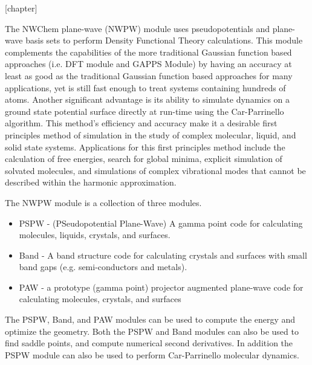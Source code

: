 \label{sec:pspw}

[chapter]
\def\thealgcounter{\thechapter.\arabic{algcounter}}
\newenvironment{algorithm}[1]
               { \refstepcounter{algcounter}
                \begin{center}
                  {\bf Algorithm} \thealgcounter: #1
                \end{center}
               \begin{center}\begin{enumerate} \begin{em}}
               {\end{em}\end{enumerate}\end{center}}
 

The NWChem plane-wave (NWPW) module uses pseudopotentials and
plane-wave basis sets to perform Density Functional Theory
calculations.  This module complements the capabilities of the more
traditional Gaussian function based approaches (i.e. DFT module and
GAPPS Module) by having an accuracy at least as good as the
traditional Gaussian function based approaches for many applications,
yet is still fast enough to treat systems containing hundreds of
atoms.  Another significant advantage is its ability to simulate
dynamics on a ground state potential surface directly at run-time
using the Car-Parrinello algorithm.  This method's efficiency and
accuracy make it a desirable first principles method of simulation in
the study of complex molecular, liquid, and solid state systems.
Applications for this first principles method include the calculation
of free energies, search for global minima, explicit simulation of
solvated molecules, and simulations of complex vibrational modes that
cannot be described within the harmonic  approximation.

The NWPW module is a collection of three modules.
\begin{itemize}
   \item PSPW - (PSeudopotential Plane-Wave) A gamma point code for
     calculating molecules, liquids, crystals, and  surfaces.  
   \item Band - A band structure code for calculating
     crystals and surfaces with small band gaps (e.g. semi-conductors
     and metals).
   \item PAW - a prototype (gamma point) projector augmented plane-wave code
     for calculating molecules, crystals, and surfaces 
\end{itemize}
The PSPW, Band, and PAW modules can be used to compute the energy and  optimize the
geometry.  Both the PSPW and Band modules can also be used to find saddle points, and 
compute numerical second derivatives.  In addition the PSPW module can also be used 
to perform Car-Parrinello molecular  dynamics.

